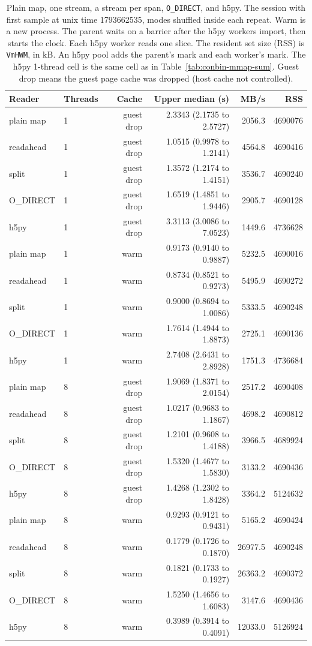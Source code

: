 \begin{table}[ht] \centering
\caption{Plain map, one stream, a stream per span, \texttt{O\_DIRECT}, and h5py.
The session with first sample at unix time 1793662535, modes shuffled
inside each repeat.
Warm is a new process.
The parent waits on a barrier after the h5py workers import, then starts
the clock.
Each h5py worker reads one slice.
The resident set size (RSS) is \texttt{VmHWM}, in kB.
An h5py pool adds the parent's mark and each worker's mark.
The h5py 1-thread cell is the same cell as in
Table~\ref{tab:conbin-mmap-sum}.
Guest drop means the guest page cache was dropped (host cache not
controlled).}
\label{tab:conbin-scale}
\begin{tabular}{@{}llrrrr@{}}
\toprule
Reader & Threads & Cache & Upper median (s) & MB/s & RSS \\
\midrule
plain map & 1 & guest drop & 2.3343 (2.1735 to 2.5727) & 2056.3 & 4690076 \\
readahead & 1 & guest drop & 1.0515 (0.9978 to 1.2141) & 4564.8 & 4690416 \\
split & 1 & guest drop & 1.3572 (1.2174 to 1.4151) & 3536.7 & 4690240 \\
O\_DIRECT & 1 & guest drop & 1.6519 (1.4851 to 1.9446) & 2905.7 & 4690128 \\
h5py & 1 & guest drop & 3.3113 (3.0086 to 7.0523) & 1449.6 & 4736628 \\
plain map & 1 & warm & 0.9173 (0.9140 to 0.9887) & 5232.5 & 4690016 \\
readahead & 1 & warm & 0.8734 (0.8521 to 0.9273) & 5495.9 & 4690272 \\
split & 1 & warm & 0.9000 (0.8694 to 1.0086) & 5333.5 & 4690248 \\
O\_DIRECT & 1 & warm & 1.7614 (1.4944 to 1.8873) & 2725.1 & 4690136 \\
h5py & 1 & warm & 2.7408 (2.6431 to 2.8928) & 1751.3 & 4736684 \\
plain map & 8 & guest drop & 1.9069 (1.8371 to 2.0154) & 2517.2 & 4690408 \\
readahead & 8 & guest drop & 1.0217 (0.9683 to 1.1867) & 4698.2 & 4690812 \\
split & 8 & guest drop & 1.2101 (0.9608 to 1.4188) & 3966.5 & 4689924 \\
O\_DIRECT & 8 & guest drop & 1.5320 (1.4677 to 1.5830) & 3133.2 & 4690436 \\
h5py & 8 & guest drop & 1.4268 (1.2302 to 1.8428) & 3364.2 & 5124632 \\
plain map & 8 & warm & 0.9293 (0.9121 to 0.9431) & 5165.2 & 4690424 \\
readahead & 8 & warm & 0.1779 (0.1726 to 0.1870) & 26977.5 & 4690248 \\
split & 8 & warm & 0.1821 (0.1733 to 0.1927) & 26363.2 & 4690372 \\
O\_DIRECT & 8 & warm & 1.5250 (1.4656 to 1.6083) & 3147.6 & 4690436 \\
h5py & 8 & warm & 0.3989 (0.3914 to 0.4091) & 12033.0 & 5126924 \\
\bottomrule
\end{tabular}
\end{table}
